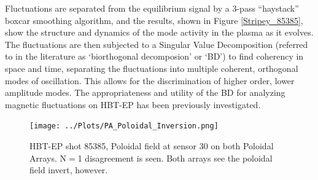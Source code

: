\documentclass[aps,prl,twocolumn,superscriptaddress,groupedaddress]{revtex4}  %
\begin{document}
	Fluctuations are separated from the equilibrium signal by a 3-pass ``haystack'' boxcar smoothing algorithm, and the results, shown in Figure \ref{Stripey_85385}, show the structure and dynamics of the mode activity in the plasma as it evolves.  The fluctuations are then subjected to a Singular Value Decomposition (referred to in the literature as `biorthogonal decomposion' or `BD'\cite{de Wit}) to find coherency in space and time, separating the fluctuations into multiple coherent, orthogonal modes of oscillation.  This allows for the discrimination of higher order, lower amplitude modes.  The appropriateness and utility of the BD for analyzing magnetic fluctuations on HBT-EP has been previously investigated\cite{Levesque}.\par
\begin{figure}[t]
\centering
\texttt{[image: ../Plots/PA\_Poloidal\_Inversion.png]}\caption{HBT-EP shot 85385, Poloidal field at sensor 30 on both Poloidal Arrays.  N$=$1 disagreement is seen. Both arrays see the poloidal field invert, however.}
\label{PA_Poloidal_Inversion}
\end{figure}
\end{document}
